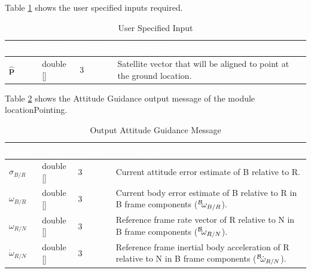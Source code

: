 \documentclass[]{AVSSimReportMemo}
\begin{document}
Table \ref{tab:inputCelTable} shows the user specified inputs required.
\begin{table}[h!]
	\centering
	\caption{User Specified Input}
	\begin{tabular}{|l|l|l|p{3in}|}
		\hline
		\rowcolor{BrickRed}
		\textcolor{white}{Name} & \textcolor{white}{Type} & 
		\textcolor{white}{Length} & 
		\textcolor{white}{Description}  \\ \hline
		$\hat{\bm{p}}$  & double [] & 3 & 
		Satellite vector that will be aligned to point at the ground location. \\ \hline
	\end{tabular}
	\label{tab:inputCelTable}
\end{table}


Table \ref{tab:outputTable} shows the Attitude Guidance output message of the module locationPointing.
\begin{table}[h!]
	\centering
	\caption{Output Attitude Guidance Message}
	\begin{tabular}{|l|l|l|p{3in}|}
		\hline
		\rowcolor{BrickRed}
		\textcolor{white}{Name} & \textcolor{white}{Type} & 
		\textcolor{white}{Length} & 
		\textcolor{white}{Description}  \\ \hline
		$\sigma_{B/R}$ & double [] & 3 & Current attitude error estimate of B relative to R.
		 \\ \hline
		$\omega_{B/R}$ & double [] & 3 & 
		 Current body error estimate of B relative to R in B frame components ($\leftexp{B}{\omega_{B/R}}$).
		 \\ \hline
		${{\omega}_{R/N}}$ & double [] & 3 & Reference frame rate vector of R relative to N in B frame components
	    ($\leftexp{B} {{\omega}_{R/N}}$).	\\ \hline
		$ {\dot{\omega}_{R/N}}$ & double [] & 3 & Reference frame inertial body acceleration of R relative to N in B frame components
			($\leftexp{B} {\dot{\omega}_{R/N}}$).\\ \hline
	\end{tabular}
	\label{tab:outputTable}
\end{table}
\newpage
\end{document}
